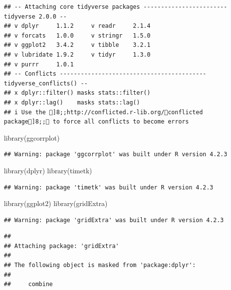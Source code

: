 \documentclass[
]{article}
\newenvironment{Shaded}{\begin{snugshade}}{\end{snugshade}}
\newcommand{\FunctionTok}[1]{\textcolor[rgb]{0.00,0.00,0.00}{#1}}
\newcommand{\NormalTok}[1]{#1}
\begin{document}
\begin{verbatim}
## -- Attaching core tidyverse packages ------------------------ tidyverse 2.0.0 --
## v dplyr     1.1.2     v readr     2.1.4
## v forcats   1.0.0     v stringr   1.5.0
## v ggplot2   3.4.2     v tibble    3.2.1
## v lubridate 1.9.2     v tidyr     1.3.0
## v purrr     1.0.1     
## -- Conflicts ------------------------------------------ tidyverse_conflicts() --
## x dplyr::filter() masks stats::filter()
## x dplyr::lag()    masks stats::lag()
## i Use the ]8;;http://conflicted.r-lib.org/conflicted package]8;; to force all conflicts to become errors
\end{verbatim}

\begin{Shaded}
\begin{Highlighting}[]
\FunctionTok{library}\NormalTok{(ggcorrplot)}
\end{Highlighting}
\end{Shaded}

\begin{verbatim}
## Warning: package 'ggcorrplot' was built under R version 4.2.3
\end{verbatim}

\begin{Shaded}
\begin{Highlighting}[]
\FunctionTok{library}\NormalTok{(dplyr)}
\FunctionTok{library}\NormalTok{(timetk)}
\end{Highlighting}
\end{Shaded}

\begin{verbatim}
## Warning: package 'timetk' was built under R version 4.2.3
\end{verbatim}

\begin{Shaded}
\begin{Highlighting}[]
\FunctionTok{library}\NormalTok{(ggplot2)}
\FunctionTok{library}\NormalTok{(gridExtra)}
\end{Highlighting}
\end{Shaded}

\begin{verbatim}
## Warning: package 'gridExtra' was built under R version 4.2.3
\end{verbatim}

\begin{verbatim}
## 
## Attaching package: 'gridExtra'
## 
## The following object is masked from 'package:dplyr':
## 
##     combine
\end{verbatim}
\end{document}
